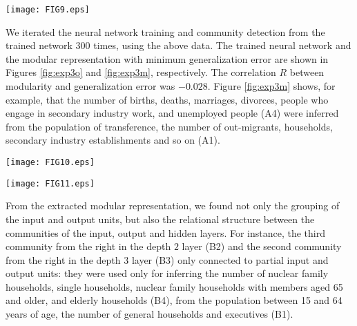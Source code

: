 \documentclass[12pt]{article} %
\begin{document}
\begin{figure*}
  \centering
  \texttt{[image: FIG9.eps]}\vspace{-5mm}
  \caption{Histogram of each dimension of data that contain the characteristics of each municipality in Japan. The data were converted through the function of $\log (1+x)$. The notations are shown in Table \ref{tab:notationsdata}.}
  \label{fig:exp3data}
\end{figure*}

We iterated the neural network training and community detection from the trained network $300$ times, using the above data. The trained neural network and the modular representation with minimum generalization error are shown in Figures \ref{fig:exp3o} and \ref{fig:exp3m}, respectively. The correlation $R$ between modularity and generalization error was $-0.028$. Figure \ref{fig:exp3m} shows, for example, that the number of births, deaths, marriages, divorces, people who engage in secondary industry work, and unemployed people (A4) were inferred from the population of transference, the number of out-migrants, households, secondary industry establishments and so on (A1).

\begin{figure*}
  \centering
  \texttt{[image: FIG10.eps]}\vspace{-5mm}
  \caption{Trained neural network for practical data. The input and output data notations are shown in Table \ref{tab:notationsdata}.}\vspace{6mm}
  \label{fig:exp3o}
  \centering
  \texttt{[image: FIG11.eps]}\vspace{-1mm}
  \caption{Extracted modular representation of trained neural network. This figure shows, for example, that the number of births, deaths, marriages, divorces, people who engage in secondary industry work, and unemployed people (A4) were inferred from the population of transference, the number of out-migrants, households, secondary industry establishments and so on (A1).}
  \label{fig:exp3m}
\end{figure*}

From the extracted modular representation, we found not only the grouping of the input and output units, but also the relational structure between the communities of the input, output and hidden layers. For instance, the third community from the right in the depth $2$ layer (B2) and the second community from the right in the depth $3$ layer (B3) only connected to partial input and output units: they were used only for inferring the number of nuclear family households, single households, nuclear family households with members aged 65 and older, and elderly households (B4), from the population between 15 and 64 years of age, the number of general households and executives (B1).
\end{document}
